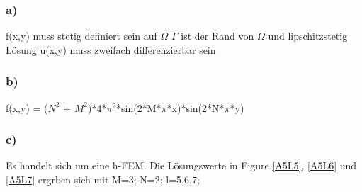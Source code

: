 \documentclass{report}
\begin{document}
	\subsubsection{a)}
	f(x,y) muss stetig definiert sein auf $\Omega$ \newline
	$\Gamma$ ist der Rand von $\Omega$ und lipschitzstetig  \newline
	L\"{o}sung u(x,y) muss zweifach differenzierbar sein 
	\subsubsection{b)}
	f(x,y) = ($N^2$ + $M^2$)*4*$\pi^2$*sin(2*M*$\pi$*x)*sin(2*N*$\pi$*y)
	\subsubsection{c)}
	Es handelt sich um eine h-FEM.  \newline
	Die Lösungswerte in Figure \ref{A5L5}, \ref{A5L6} und \ref{A5L7} ergrben sich mit M=3; N=2; l=5,6,7;  \newline
\end{document}

